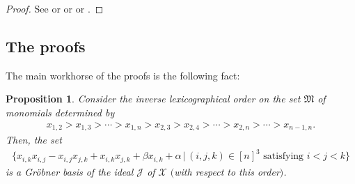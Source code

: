 \documentclass[pdftex]{sigma}
\newtheorem{Proposition}[Theorem]{Proposition}
\numberwithin{equation}{section}
\begin{document}
\begin{proof}See \cite[Chapter 5, Section~3, Propositions~1 and~4]{CoLiOs15} or \cite[Th\'{e}or\`{e}me in the section ``Espaces quotients'']{Monass02} or \cite[Theorem~1.2.6]{Sturmf08} or \cite{verlong}.
\end{proof}

\subsection{The proofs}

The main workhorse of the proofs is the following fact:

\begin{Proposition}\label{prop.forkless.groebner}Consider the inverse lexicographical order on the set $\mathfrak{M}$ of monomials determined by
\begin{gather*}
 x_{1,2}>x_{1,3}>\cdots>x_{1,n} >x_{2,3}>x_{2,4}>\cdots>x_{2,n} >\cdots >x_{n-1,n}.
\end{gather*}
Then, the set
\begin{gather}
\big\{ x_{i,k}x_{i,j}-x_{i,j}x_{j,k}+x_{i,k}x_{j,k}+\beta x_{i,k}+\alpha\,|\, (i,j,k) \in[n] ^{3}\text{ satisfying }i<j<k\big\} \label{eq.prop.forkless.groebner.family}
\end{gather}
is a Gr\"{o}bner basis of the ideal $\mathcal{J}$ of $\mathcal{X}$ $($with respect to this order$)$.
\end{Proposition}
\end{document}
